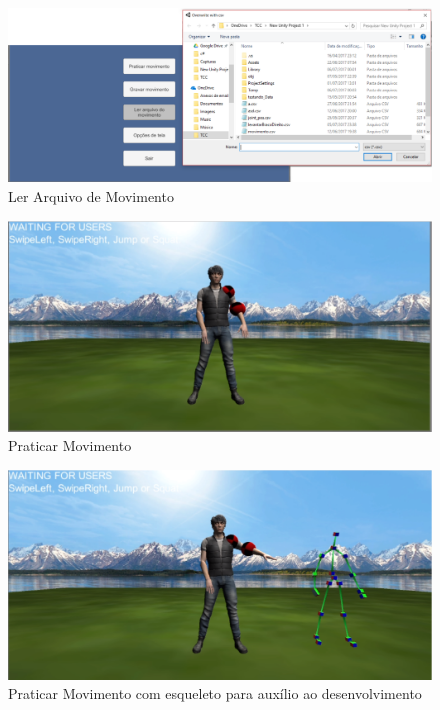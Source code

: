   \begin{figure}[H]
  \centering
  \includegraphics [keepaspectratio=true,scale=0.40]{figuras/lerarquivo.eps}
  \caption{Ler Arquivo de Movimento}
  \label{img:lerArquivo}
  \end{figure}

  \begin{figure}[H]
  \centering
  \includegraphics [keepaspectratio=true,scale=0.40]{figuras/praticarmovimento.eps}
  \caption{Praticar Movimento}
  \label{img:praticarMovimento}
  \end{figure}

  \begin{figure}[H]
  \centering
  \includegraphics [keepaspectratio=true,scale=0.40]{figuras/praticarmovimento2.eps}
  \caption{Praticar Movimento com esqueleto para auxílio ao desenvolvimento}
  \label{img2:praticarMovimento}
  \end{figure}



